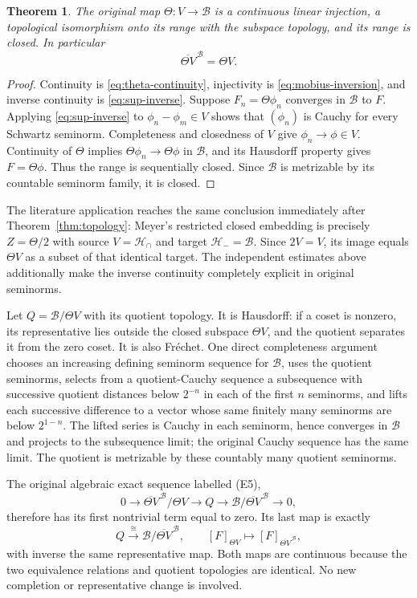 \documentclass[11pt]{article}
\newtheorem{theorem}{Theorem}
\newcommand{\B}{\mathscr B}
\newcommand{\HH}{\mathcal H}
\begin{document}
\begin{theorem}\label{thm:closed}
The original map $\Theta:V\to\B$ is a continuous linear injection,
a topological isomorphism onto its range with the subspace topology,
and its range is closed. In particular
\begin{equation}\label{eq:closed}
 \overline{\Theta V}^{\,\B}=\Theta V.
\end{equation}
\end{theorem}

\begin{proof}
Continuity is \eqref{eq:theta-continuity}, injectivity is
\eqref{eq:mobius-inversion}, and inverse continuity is
\eqref{eq:sup-inverse}. Suppose $F_n=\Theta\phi_n$ converges in $\B$
to $F$. Applying \eqref{eq:sup-inverse} to
$\phi_n-\phi_m\in V$ shows that $(\phi_n)$ is Cauchy for every
Schwartz seminorm. Completeness and closedness of $V$ give
$\phi_n\to\phi\in V$. Continuity of $\Theta$ implies
$\Theta\phi_n\to\Theta\phi$ in $\B$, and its Hausdorff property gives
$F=\Theta\phi$. Thus the range is sequentially closed. Since $\B$ is
metrizable by its countable seminorm family, it is closed.
\end{proof}

The literature application reaches the same conclusion immediately
after Theorem~\ref{thm:topology}: Meyer's restricted closed embedding
is precisely $Z=\Theta/2$ with source $V=\HH_\cap$ and target
$\HH_-=\B$. Since $2V=V$, its image equals $\Theta V$ as a subset of
that identical target. The independent estimates above additionally
make the inverse continuity completely explicit in original seminorms.

Let $Q=\B/\Theta V$ with its quotient topology. It is Hausdorff:
if a coset is nonzero, its representative lies outside the closed
subspace $\Theta V$, and the quotient separates it from the zero
coset. It is also Fr\'echet. One direct completeness argument chooses
an increasing defining seminorm sequence for $\B$, uses the quotient
seminorms, selects from a quotient-Cauchy sequence a subsequence with
successive quotient distances below $2^{-n}$ in each of the first
$n$ seminorms, and lifts each successive difference to a vector whose
same finitely many seminorms are below $2^{1-n}$. The lifted series is
Cauchy in each seminorm, hence converges in $\B$ and projects to the
subsequence limit; the original Cauchy sequence has the same limit.
The quotient is metrizable by these countably many quotient seminorms.

The original algebraic exact sequence labelled (E5),
\[
 0\longrightarrow
 \overline{\Theta V}^{\,\B}/\Theta V\longrightarrow Q
 \longrightarrow\B/\overline{\Theta V}^{\,\B}\longrightarrow0,
\]
therefore has its first nontrivial term equal to zero. Its last map
is exactly
\begin{equation}\label{eq:E5}
 Q\xrightarrow{\ \cong\ }\B/\overline{\Theta V}^{\,\B},
 \qquad [F]_{\Theta V}\longmapsto[F]_{\overline{\Theta V}^{\,\B}},
\end{equation}
with inverse the same representative map. Both maps are continuous
because the two equivalence relations and quotient topologies are
identical. No new completion or representative change is involved.
\end{document}
